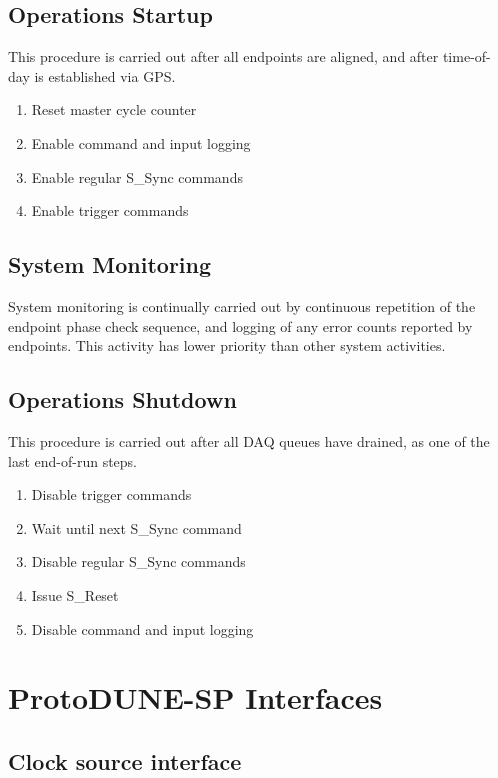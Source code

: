 \documentclass[a4paper,11pt]{article}
\begin{document}
\subsection{Operations Startup}

This procedure is carried out after all endpoints are aligned, and after time-of-day is established via GPS.

\begin{enumerate}
	\item Reset master cycle counter
	\item Enable command and input logging
	\item Enable regular S\_Sync commands
	\item Enable trigger commands
\end{enumerate}

\subsection{System Monitoring}

System monitoring is continually carried out by continuous repetition of the endpoint phase check sequence, and logging of any error counts reported by endpoints. This activity has lower priority than other system activities.

\subsection{Operations Shutdown}

This procedure is carried out after all DAQ queues have drained, as one of the last end-of-run steps.

\begin{enumerate} 
	\item Disable trigger commands
	\item Wait until next S\_Sync command
	\item Disable regular S\_Sync commands
	\item Issue S\_Reset
	\item Disable command and input logging
\end{enumerate}

\section{ProtoDUNE-SP Interfaces}

\subsection{Clock source interface}
\end{document}
